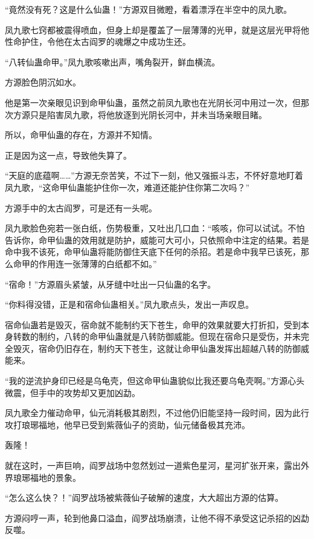 
\begin{this_body}

“竟然没有死？这是什么仙蛊！”方源双目微瞪，看着漂浮在半空中的凤九歌。

凤九歌七窍都被震得喷血，但身上却是覆盖了一层薄薄的光甲，就是这层光甲将他性命护住，令他在太古阎罗的魂爆之中成功生还。

“八转仙蛊命甲。”凤九歌咳嗽出声，嘴角裂开，鲜血横流。

方源脸色阴沉如水。

他是第一次亲眼见识到命甲仙蛊，虽然之前凤九歌也在光阴长河中用过一次，但那次方源只是陷害凤九歌，将他放逐到光阴长河中，并未当场亲眼目睹。

所以，命甲仙蛊的存在，方源并不知情。

正是因为这一点，导致他失算了。

“天庭的底蕴啊……”方源无奈苦笑，不过下一刻，他又强振斗志，不怀好意地盯着凤九歌，“这命甲仙蛊能护住你一次，难道还能护住你第二次吗？”

方源手中的太古阎罗，可是还有一头呢。

凤九歌脸色宛若一张白纸，伤势极重，又吐出几口血：“咳咳，你可以试试。不怕告诉你，命甲仙蛊的效用就是防护，威能可大可小，只依照命中注定的结果。若是命中我不该死，命甲仙蛊将能防御住天底下任何的杀招。若是命中我早已该死，那么命甲的作用连一张薄薄的白纸都不如。”

“宿命！”方源眉头紧皱，从牙缝中吐出一只仙蛊的名字。

“你料得没错，正是和宿命仙蛊相关。”凤九歌点头，发出一声叹息。

宿命仙蛊若是毁灭，宿命就不能制约天下苍生，命甲的效果就要大打折扣，受到本身转数的制约，八转的命甲仙蛊就是八转防御威能。但现在宿命只是受伤，并未完全毁灭，宿命仍旧存在，制约天下苍生，这就让命甲仙蛊发挥出超越八转的防御威能来。

“我的逆流护身印已经是乌龟壳，但这命甲仙蛊貌似比我还要乌龟壳啊。”方源心头微震，但手中的攻势却又更加凶勐。

凤九歌全力催动命甲，仙元消耗极其剧烈，不过他仍旧能坚持一段时间，因为此行攻打琅琊福地，他早已受到紫薇仙子的资助，仙元储备极其充沛。

轰隆！

就在这时，一声巨响，阎罗战场中忽然划过一道紫色星河，星河扩张开来，露出外界琅琊福地的景象。

“怎么这么快？！”阎罗战场被紫薇仙子破解的速度，大大超出方源的估算。

方源闷哼一声，轮到他鼻口溢血，阎罗战场崩溃，让他不得不承受这记杀招的凶勐反噬。


\end{this_body}
